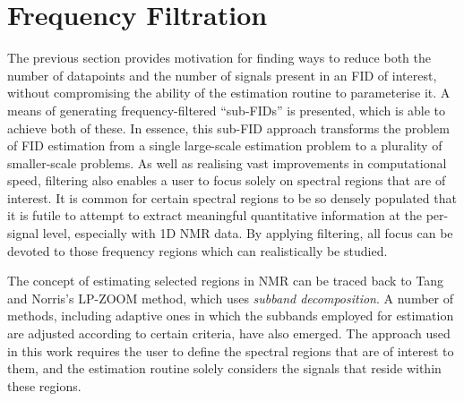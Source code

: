 \section{Frequency Filtration}
\label{sec:filtering}
The previous section provides motivation for finding ways to reduce both the
number of datapoints and the number of signals present in an \ac{FID} of
interest, without compromising the ability of the estimation routine
to parameterise it. A means of generating frequency-filtered ``sub-\acp{FID}''
is presented, which is able to achieve both of these. In essence, this
sub-\ac{FID} approach transforms the problem of \ac{FID} estimation from a
single large-scale estimation problem to a plurality of smaller-scale problems.
As well as realising vast improvements in computational speed, filtering also
enables a user to focus solely on spectral regions that are of interest.
It is common for certain spectral regions to be so densely populated
that it is futile to attempt to extract meaningful quantitative information at
the per-signal level, especially with \ac{1D} \ac{NMR} data. By applying
filtering, all focus can be devoted to those frequency regions which can
realistically be studied.

The concept of estimating selected regions in \ac{NMR} can be traced back to
Tang and Norris's \ac{LP}-ZOOM method\cite{Tang1988}, which uses
\textit{subband decomposition}. A number of methods, including adaptive ones
in which the subbands employed for estimation are adjusted according to certain
criteria, have also emerged\cite{Djermoune2004}. The approach
used in this work requires the user to define the spectral regions that are of
interest to them, and the estimation routine solely considers the signals that
reside within these regions.

